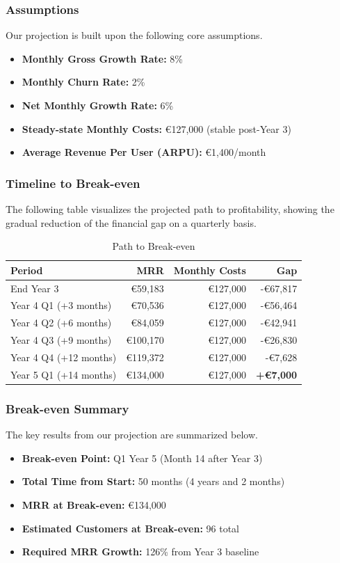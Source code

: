 \documentclass[11pt, a4paper, oneside]{article}
\begin{document}
\subsubsection{Assumptions}
Our projection is built upon the following core assumptions.
\begin{itemize}
    \item \textbf{Monthly Gross Growth Rate:} 8\%
    \item \textbf{Monthly Churn Rate:} 2\%
    \item \textbf{Net Monthly Growth Rate:} 6\%
    \item \textbf{Steady-state Monthly Costs:} \euro{127,000} (stable post-Year 3)
    \item \textbf{Average Revenue Per User (ARPU):} \euro{1,400}/month
\end{itemize}

\subsubsection{Timeline to Break-even}
The following table visualizes the projected path to profitability, showing the gradual reduction of the financial gap on a quarterly basis.
\begin{table}[H]
    \centering
    \caption{Path to Break-even}
    \begin{tabular}{lrrr}
    \toprule
    \textbf{Period} & \textbf{MRR} & \textbf{Monthly Costs} & \textbf{Gap} \\
    \midrule
    End Year 3 & \euro{59,183} & \euro{127,000} & -\euro{67,817} \\
    Year 4 Q1 (+3 months) & \euro{70,536} & \euro{127,000} & -\euro{56,464} \\
    Year 4 Q2 (+6 months) & \euro{84,059} & \euro{127,000} & -\euro{42,941} \\
    Year 4 Q3 (+9 months) & \euro{100,170} & \euro{127,000} & -\euro{26,830} \\
    Year 4 Q4 (+12 months) & \euro{119,372} & \euro{127,000} & -\euro{7,628} \\
    Year 5 Q1 (+14 months) & \euro{134,000} & \euro{127,000} & \textbf{+\euro{7,000}} \\
    \bottomrule
    \end{tabular}
\end{table}

\subsubsection{Break-even Summary}
The key results from our projection are summarized below.
\begin{itemize}
    \item \textbf{Break-even Point:} Q1 Year 5 (Month 14 after Year 3)
    \item \textbf{Total Time from Start:} 50 months (4 years and 2 months)
    \item \textbf{MRR at Break-even:} \euro{134,000}
    \item \textbf{Estimated Customers at Break-even:} 96 total
    \item \textbf{Required MRR Growth:} 126\% from Year 3 baseline
\end{itemize}
\end{document}

